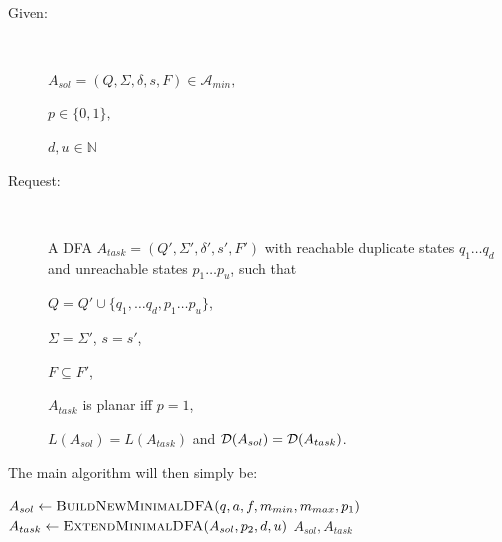 \begin{definition}[ExtendMinimalDFA] $ $
	\begin{description}
		
		\item[Given:] $ $
		
		$A_{sol} = (Q, \Sigma, \delta, s, F) \in \mathcal{A}_{min},$
		
		$p \in \{0,1\},$
		
		$d, u \in \mathbb{N}$
		\item[Request:] $ $
		
		A DFA $A_{task} = (Q', \Sigma', \delta', s', F')$ with reachable duplicate states $q_1 \ldots q_d$ and unreachable states $p_1 \ldots p_u$, such that
		
		$Q = Q' \cup \{ q_1, \ldots q_d, p_1 \ldots p_u \}$,
		
		$\Sigma = \Sigma'$, $s = s'$,
		
		$F \subseteq F'$,
		
		$A_{task}$ is planar iff $p = 1$,
		
		$L(A_{sol}) = L(A_{task})$ and $\mathcal{D}(A_{sol}) = \mathcal{D}(A_{task})$.
	\end{description}
\end{definition}

\noindent The main algorithm will then simply be:
\vspace{0.2cm}
\begin{algorithmic}[1]
	\State $A_{sol} \gets \textsc{BuildNewMinimalDFA}(q, a, f, m_{min}, m_{max}, p_1)$
	\State $A_{task} \gets \textsc{ExtendMinimalDFA}(A_{sol}, p_2, d, u)$
	\State \Return $A_{sol}, A_{task}$
	\EndFunction
\end{algorithmic}


